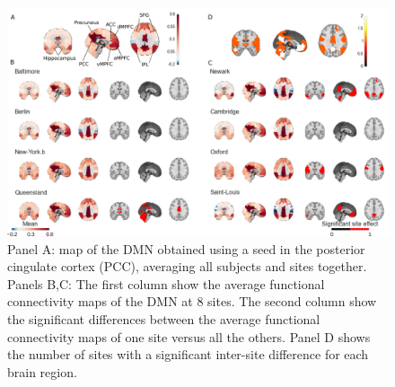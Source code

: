 \documentclass[authoryear]{elsarticle}
\begin{document}
\begin{figure}[htbp]
\begin{center}
\includegraphics[width=\linewidth]{../figures/dmn_multisite.png}
\end{center}
\caption[DMN variability across sites]{
Panel A: map of the DMN obtained using a seed in the posterior cingulate cortex (PCC), averaging all subjects and sites together. Panels B,C:  The first column show the average functional connectivity maps of the DMN at 8 sites. The second column show the significant differences between the average functional connectivity maps of one site versus all the others. Panel D shows the number of sites with a significant inter-site difference for each brain region.
}
\label{fig_DMN_variability}
\end{figure}
\end{document}
